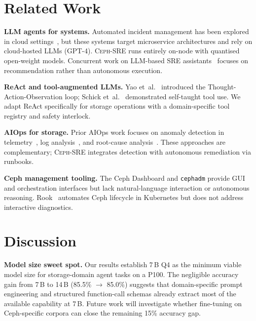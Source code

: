 \documentclass[sigplan,nonacm,10pt]{acmart}
\newcommand{\sysname}{\textsc{Ceph-SRE}\xspace}
\begin{document}
\section{Related Work}\label{sec:related}

\textbf{LLM agents for systems.}\enspace
Automated incident management has been explored in cloud
settings~\cite{chen2024automatic}, but these systems target
microservice architectures and rely on cloud-hosted LLMs (GPT-4).
\sysname runs entirely on-node with quantised open-weight models.
Concurrent work on LLM-based SRE assistants~\cite{ahmed2023recommending}
focuses on recommendation rather than autonomous execution.

\textbf{ReAct and tool-augmented LLMs.}\enspace
Yao et~al.~\cite{yao2023react} introduced the Thought-Action-Observation
loop; Schick et~al.~\cite{schick2023toolformer} demonstrated
self-taught tool use.
We adapt ReAct specifically for storage operations with a
domain-specific tool registry and safety interlock.

\textbf{AIOps for storage.}\enspace
Prior AIOps work focuses on anomaly detection in
telemetry~\cite{zhao2021empirical},
log analysis~\cite{he2021survey}, and
root-cause analysis~\cite{soldani2022anomaly}.
These approaches are complementary; \sysname integrates detection
with autonomous remediation via runbooks.

\textbf{Ceph management tooling.}\enspace
The Ceph Dashboard and \texttt{cephadm} provide GUI and
orchestration interfaces but lack natural-language interaction
or autonomous reasoning.
Rook~\cite{rook} automates Ceph lifecycle in Kubernetes but does
not address interactive diagnostics.


\section{Discussion}\label{sec:discussion}

\textbf{Model size sweet spot.}\enspace
Our results establish 7\,B Q4 as the minimum viable model size for
storage-domain agent tasks on a P100.
The negligible accuracy gain from 7\,B to 14\,B
(85.5\% $\to$ 85.0\%) suggests that domain-specific
prompt engineering and structured function-call schemas already
extract most of the available capability at 7\,B.
Future work will investigate whether fine-tuning on Ceph-specific
corpora can close the remaining 15\% accuracy gap.
\end{document}

